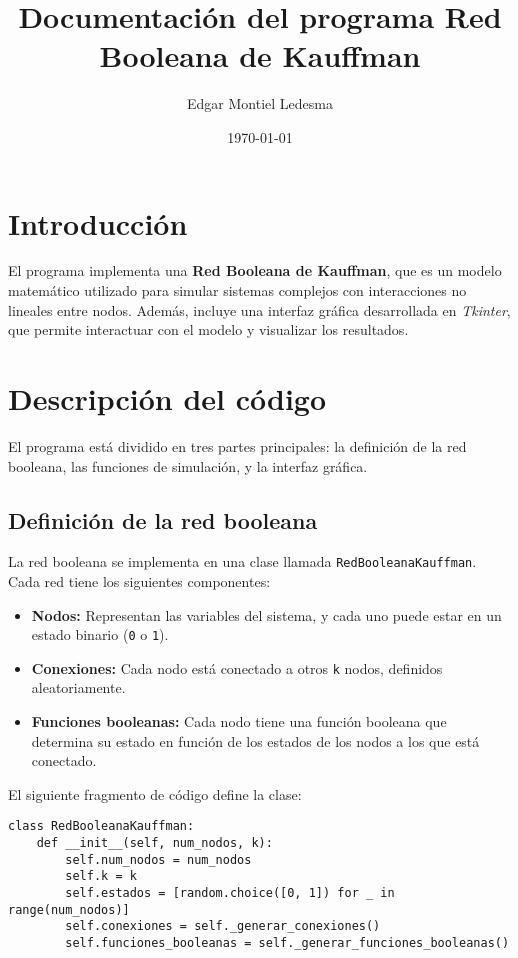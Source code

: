 \documentclass[12pt]{article}
\title{Documentación del programa Red Booleana de Kauffman}
\author{Edgar Montiel Ledesma}
\date{\today}
\begin{document}
\maketitle

\section{Introducción}
El programa implementa una \textbf{Red Booleana de Kauffman}, que es un modelo matemático utilizado para simular sistemas complejos con interacciones no lineales entre nodos. Además, incluye una interfaz gráfica desarrollada en \textit{Tkinter}, que permite interactuar con el modelo y visualizar los resultados.

\section{Descripción del código}
El programa está dividido en tres partes principales: la definición de la red booleana, las funciones de simulación, y la interfaz gráfica.

\subsection{Definición de la red booleana}
La red booleana se implementa en una clase llamada \texttt{RedBooleanaKauffman}. Cada red tiene los siguientes componentes:

\begin{itemize}
    \item \textbf{Nodos:} Representan las variables del sistema, y cada uno puede estar en un estado binario (\texttt{0} o \texttt{1}).
    \item \textbf{Conexiones:} Cada nodo está conectado a otros \texttt{k} nodos, definidos aleatoriamente.
    \item \textbf{Funciones booleanas:} Cada nodo tiene una función booleana que determina su estado en función de los estados de los nodos a los que está conectado.
\end{itemize}

\noindent El siguiente fragmento de código define la clase:

\begin{lstlisting}
class RedBooleanaKauffman:
    def __init__(self, num_nodos, k):
        self.num_nodos = num_nodos
        self.k = k
        self.estados = [random.choice([0, 1]) for _ in range(num_nodos)]
        self.conexiones = self._generar_conexiones()
        self.funciones_booleanas = self._generar_funciones_booleanas()
\end{lstlisting}
\end{document}
